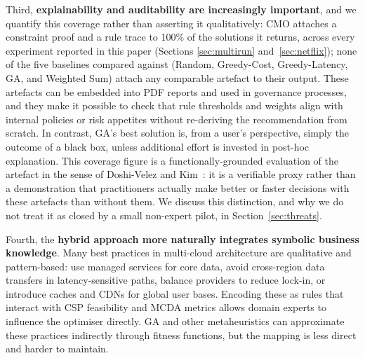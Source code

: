 \documentclass[journal]{IEEEtran}
\newcommand{\cmo}{CMO\xspace}
\begin{document}
Third, \textbf{explainability and auditability are increasingly important},
and we quantify this coverage rather than asserting it qualitatively:
\cmo attaches a constraint proof and a rule trace to 100\% of the solutions
it returns, across every experiment reported in this paper (Sections
\ref{sec:multirun} and~\ref{sec:netflix}); none of the five baselines compared
against (Random, Greedy-Cost, Greedy-Latency, GA, and Weighted Sum) attach any
comparable artefact to their output. These artefacts can be embedded into PDF reports
and used in governance processes, and they make it possible to check that
rule thresholds and weights align with internal policies or risk appetites
without re-deriving the recommendation from scratch. In contrast, GA's best
solution is, from a user's perspective, simply the outcome of a black box,
unless additional effort is invested in post-hoc explanation. This coverage
figure is a functionally-grounded evaluation of the artefact in the sense
of Doshi-Velez and Kim~\cite{doshi_rigorous}: it is a verifiable proxy rather
than a demonstration that practitioners actually make better or faster
decisions with these artefacts than without them. We discuss this
distinction, and why we do not treat it as closed by a small non-expert
pilot, in Section~\ref{sec:threats}.

Fourth, the \textbf{hybrid approach more naturally integrates symbolic business
knowledge}. Many best practices in multi-cloud architecture are qualitative and
pattern-based: use managed services for core data, avoid cross-region data
transfers in latency-sensitive paths, balance providers to reduce lock-in, or
introduce caches and CDNs for global user bases. Encoding these as rules that
interact with CSP feasibility and MCDA metrics allows domain experts to
influence the optimiser directly. GA and other metaheuristics can approximate
these practices indirectly through fitness functions, but the mapping is less
direct and harder to maintain.
\end{document}
